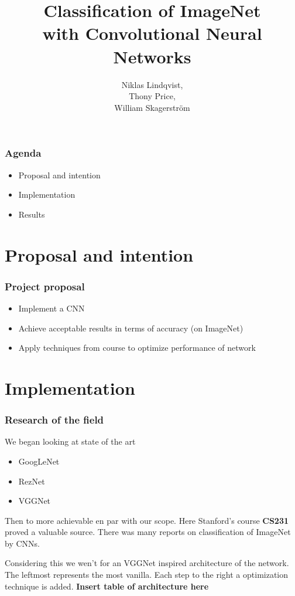 \documentclass{beamer}
\title{
  Classification of ImageNet \\
  with Convolutional Neural Networks
}
\author{
  Niklas Lindqvist,\\
  Thony Price,\\
  William Skagerström\\
}
\begin{document}
\maketitle

\begin{frame}
  \frametitle{Agenda}

  \begin{itemize}
    \item Proposal and intention
    \item Implementation
    \item Results
  \end{itemize}
\end{frame}

\section{Proposal and intention}
\begin{frame}
  \frametitle{Project proposal}
  \begin{itemize}
	  \item Implement a CNN
    \item Achieve acceptable results in terms of accuracy (on ImageNet)
    \item Apply techniques from course to optimize performance of network
  \end{itemize}
\end{frame}

\section{Implementation}
\begin{frame}
  \frametitle{Research of the field}
  We began looking at state of the art
  \begin{itemize}
    \item GoogLeNet
    \item RezNet
    \item VGGNet
  \end{itemize}

  Then to more achievable en par with our scope. Here Stanford's course \textbf{CS231} proved a valuable source. There was many reports on classification of ImageNet by CNNs.
\end{frame}

\begin{frame}
  Considering this we wen't for an VGGNet inspired architecture of the network. The leftmost represents the most vanilla. Each step to the right a optimization technique is added.
  \textbf{Insert table of architecture here}
\end{frame}
\end{document}
